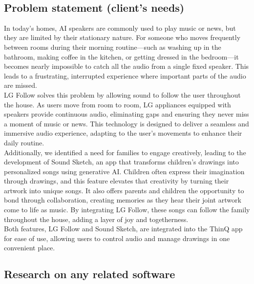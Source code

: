 \documentclass[conference]{IEEEtran}
\begin{document}
\
\
\
\subsection{Problem statement (client’s needs)}

In today’s homes, AI speakers are commonly used to play music or news, but they are limited by their stationary nature. For someone who moves frequently between rooms during their morning routine—such as washing up in the bathroom, making coffee in the kitchen, or getting dressed in the bedroom—it becomes nearly impossible to catch all the audio from a single fixed speaker. This leads to a frustrating, interrupted experience where important parts of the audio are missed.\\

LG Follow solves this problem by allowing sound to follow the user throughout the house. As users move from room to room, LG appliances equipped with speakers provide continuous audio, eliminating gaps and ensuring they never miss a moment of music or news. This technology is designed to deliver a seamless and immersive audio experience, adapting to the user's movements to enhance their daily routine.\\

Additionally, we identified a need for families to engage creatively, leading to the development of Sound Sketch, an app that transforms children's drawings into personalized songs using generative AI. Children often express their imagination through drawings, and this feature elevates that creativity by turning their artwork into unique songs. It also offers parents and children the opportunity to bond through collaboration, creating memories as they hear their joint artwork come to life as music. By integrating LG Follow, these songs can follow the family throughout the house, adding a layer of joy and togetherness.\\

Both features, LG Follow and Sound Sketch, are integrated into the ThinQ app for ease of use, allowing users to control audio and manage drawings in one convenient place. \\

 
\subsection{Research on any related software}
\end{document}
